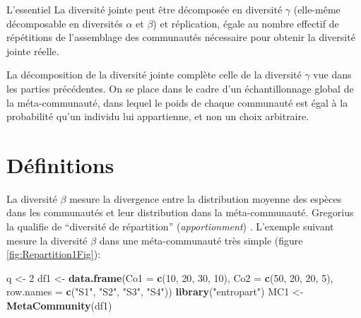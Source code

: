 \documentclass[
  11pt,
  french,
  a4paper,
  extrafontsizes,onecolumn,openright
  ]{memoir}
\newenvironment{Shaded}{\begin{snugshade}}{\end{snugshade}}
\newcommand{\DataTypeTok}[1]{\textcolor[rgb]{0.13,0.29,0.53}{#1}}
\newcommand{\DecValTok}[1]{\textcolor[rgb]{0.00,0.00,0.81}{#1}}
\newcommand{\KeywordTok}[1]{\textcolor[rgb]{0.13,0.29,0.53}{\textbf{#1}}}
\newcommand{\NormalTok}[1]{#1}
\newcommand{\StringTok}[1]{\textcolor[rgb]{0.31,0.60,0.02}{#1}}
\newenvironment{Essentiel}
  {\begin{bclogo}[logo=\bctrombone, noborder=true, couleur=lightgray!50]{L'essentiel}\parindent0pt}
  {\end{bclogo}}
\begin{document}
\begin{Essentiel}
La diversité jointe peut être décomposée en diversité \(\gamma\)
(elle-même décomposable en diversités \(\alpha\) et \(\beta\)) et
réplication, égale au nombre effectif de répétitions de l'assemblage des
communautés nécessaire pour obtenir la diversité jointe réelle.
\end{Essentiel}

\normalsize

La décomposition de la diversité jointe \autocite{Gregorius2009a,Gregorius2010} complète celle de la diversité \(\gamma\) vue dans les parties précédentes.
On se place dans le cadre d'un échantillonnage global de la méta-communauté, dans lequel le poids de chaque communauté est égal à la probabilité qu'un individu lui appartienne, et non un choix arbitraire.

\hypertarget{sec:Definitions}{%
\section{Définitions}\label{sec:Definitions}}

La diversité \(\beta\) mesure la divergence entre la distribution moyenne des espèces dans les communautés et leur distribution dans la méta-communauté.
Gregorius la qualifie de ``diversité de répartition'' (\emph{apportionment}) \autocite{Gregorius2014}.
L'exemple suivant mesure la diversité \(\beta\) dans une méta-communauté très simple (figure \ref{fig:Repartition1Fig}):

\scriptsize

\begin{Shaded}
\begin{Highlighting}[]
\NormalTok{q <-}\StringTok{ }\DecValTok{2}
\NormalTok{df1 <-}\StringTok{ }\KeywordTok{data.frame}\NormalTok{(}\DataTypeTok{Co1 =} \KeywordTok{c}\NormalTok{(}\DecValTok{10}\NormalTok{, }\DecValTok{20}\NormalTok{, }\DecValTok{30}\NormalTok{, }\DecValTok{10}\NormalTok{), }\DataTypeTok{Co2 =} \KeywordTok{c}\NormalTok{(}\DecValTok{50}\NormalTok{, }\DecValTok{20}\NormalTok{, }\DecValTok{20}\NormalTok{, }
    \DecValTok{5}\NormalTok{), }\DataTypeTok{row.names =} \KeywordTok{c}\NormalTok{(}\StringTok{"S1"}\NormalTok{, }\StringTok{"S2"}\NormalTok{, }\StringTok{"S3"}\NormalTok{, }\StringTok{"S4"}\NormalTok{))}
\KeywordTok{library}\NormalTok{(}\StringTok{"entropart"}\NormalTok{)}
\NormalTok{MC1 <-}\StringTok{ }\KeywordTok{MetaCommunity}\NormalTok{(df1)}
\end{Highlighting}
\end{Shaded}
\end{document}
